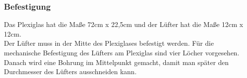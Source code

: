 \subsubsection{Befestigung}
\begin{figwindow}
Das Plexiglas hat die Maße 72cm x 22,5cm und der Lüfter hat die Maße 12cm x 12cm. \\

Der Lüfter muss in der Mitte des Plexiglases befestigt werden. Für die mechanische Befestigung des Lüfters am Plexiglas sind vier Löcher vorgesehen.\\

Danach wird eine Bohrung im Mittelpunkt gemacht, damit man später den Durchmesser des Lüfters ausschneiden kann.
\end{figwindow}